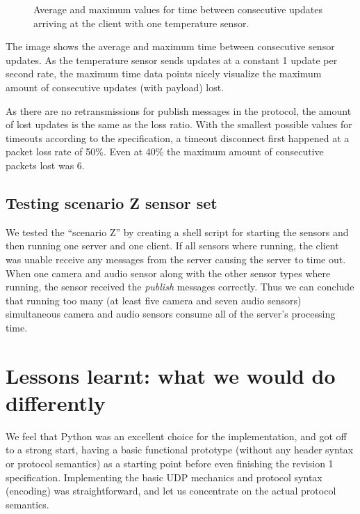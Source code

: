\documentclass[a4paper]{article}
\begin{document}
\begin{figure}[h!]
\caption{Average and maximum values for time between consecutive updates arriving at the client with one temperature sensor.} \label{fig:lossdata}
\end{figure}

The image shows the average and maximum time between consecutive sensor updates.
As the temperature sensor sends updates at a constant 1 update per second rate,
the maximum time data points nicely visualize the maximum amount of consecutive
updates (with payload) lost.

As there are no retransmissions for publish messages in the protocol, the amount
of lost updates is the same as the loss ratio. With the smallest possible values
for timeouts according to the specification, a timeout disconnect first happened
at a packet loss rate of 50\%. Even at 40\% the maximum amount of consecutive
packets lost was 6.

\subsection{Testing scenario Z sensor set}
We tested the ``scenario Z'' by creating a shell script
for starting the sensors and then running one server and one client. If all
sensors where running, the client was unable receive any messages from the
server causing the server to time out. When one camera and audio sensor along
with the other sensor types where running, the sensor received the \emph{publish}
messages correctly. Thus we can conclude that running too many (at least five
camera and seven audio sensors) simultaneous camera and audio sensors consume
all of the server's processing time.

\section{Lessons learnt: what we would do differently}

We feel that Python was an excellent choice for the implementation, and got off to a strong start, having a basic functional prototype (without any header syntax or protocol semantics) as a starting point before even finishing the revision 1 specification.
Implementing the basic UDP mechanics and protocol syntax (encoding) was straightforward, and let us concentrate on the actual protocol semantics.
\end{document}
